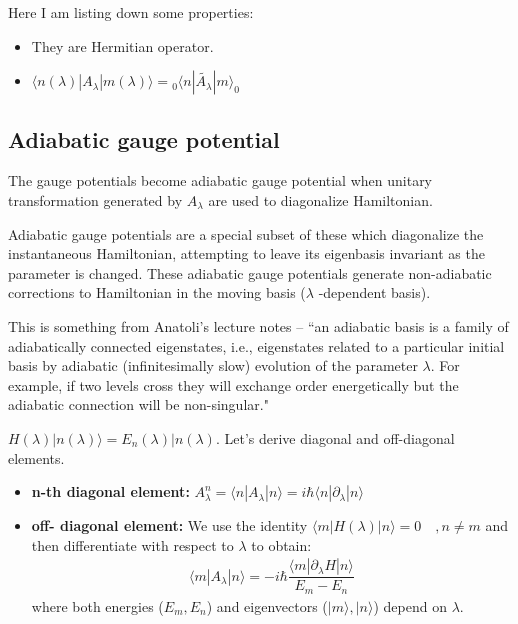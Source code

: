 \documentclass[11pt,a4paper]{article}
\begin{document}
 Here I am listing down some properties:
\begin{itemize}
\item They are Hermitian operator.\
\item $\langle n (\lambda)| A_{\lambda}| m(\lambda) \rangle = {}_0\langle  n| \tilde{A_{\lambda}}| m \rangle_0$
\end{itemize}
 

\subsection{Adiabatic gauge potential}
The gauge potentials become adiabatic gauge potential when unitary transformation generated by $A_{\lambda}$ are used to diagonalize Hamiltonian.

 Adiabatic gauge potentials are a special subset of these which diagonalize  the instantaneous Hamiltonian, attempting to leave its eigenbasis invariant as the parameter is changed. These adiabatic gauge potentials generate non-adiabatic corrections to Hamiltonian in the moving basis ($\lambda$ -dependent basis).
 
 This is something from Anatoli's lecture notes \cite{kolodrubetz2016geometry}--
``an adiabatic basis is a family of adiabatically connected eigenstates, i.e., eigenstates related
to a particular initial basis by adiabatic (infinitesimally slow) evolution of the parameter $\lambda$. For example, if two levels cross they will exchange order energetically but the adiabatic connection will be non-singular."


$H (\lambda) |n(\lambda) \rangle = E_n (\lambda) |n(\lambda) $. Let's derive diagonal and off-diagonal elements. 

\begin{itemize}
\item \textbf{n-th diagonal element:} $A_{\lambda}^n= \langle n |A_{\lambda} | n \rangle=  i \hbar\langle n |\partial_{\lambda} | n \rangle $
\item \textbf{off- diagonal element:} We use the identity $\langle m |H(\lambda) | n \rangle=0 \quad, n \neq m$ and then differentiate with respect to $\lambda$ to obtain:
\begin{align}
\boxed{\langle m |A_{\lambda} | n \rangle =  -i \hbar \dfrac{\langle m |\partial_{\lambda}H | n \rangle}{E_m-E_n}}
\end{align}
where both  energies ($E_m, E_n$) and eigenvectors ($|m \rangle, |n \rangle$) depend on $\lambda$.
\end{itemize}
\end{document}
